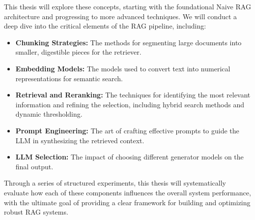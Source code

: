 This thesis will explore these concepts, starting with the foundational Naive RAG architecture and progressing to more advanced techniques. We will conduct a deep dive into the critical elements of the RAG pipeline, including:
\begin{itemize}
    \item \textbf{Chunking Strategies:} The methods for segmenting large documents into smaller, digestible pieces for the retriever.
    \item \textbf{Embedding Models:} The models used to convert text into numerical representations for semantic search.
    \item \textbf{Retrieval and Reranking:} The techniques for identifying the most relevant information and refining the selection, including hybrid search methods and dynamic thresholding.
    \item \textbf{Prompt Engineering:} The art of crafting effective prompts to guide the LLM in synthesizing the retrieved context.
    \item \textbf{LLM Selection:} The impact of choosing different generator models on the final output.
\end{itemize}

Through a series of structured experiments, this thesis will systematically evaluate how each of these components influences the overall system performance, with the ultimate goal of providing a clear framework for building and optimizing robust RAG systems.